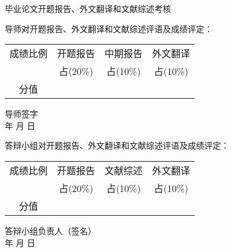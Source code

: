 
\thispagestyle{empty}
\begin{center}
\stfangsong\sanhao 毕业论文开题报告、外文翻译和文献综述考核
\end{center}
\songti\sihao 导师对开题报告、外文翻译和文献综述评语及成绩评定：
\vspace{4cm}


{\hspace{3cm} \songti\xiaosi
\begin{tabular}{|c|c|c|c|}
    \hline
    成绩比例 & \parbox[t]{4.5em}{开题报告} &\parbox[t]{4.5em}{中期报告} & \parbox[t]{4.5em}{外文翻译} \\
            & 占(20\%) & 占(10\%) & 占(10\%) \\

    \hline
    分值   & & &  \\
    \hline
\end{tabular}
}


\begin{flushright}
    导师签字\;\underline{\hspace{4em}}\\
    年 \quad 月 \quad 日
\end{flushright}

{\songti\sihao 答辩小组对开题报告、外文翻译和文献综述评语及成绩评定：}
\vspace{4cm}


{\hspace{3cm} \songti\xiaosi
\begin{tabular}{|c|c|c|c|}
    \hline
    成绩比例 & \parbox[t]{4.5em}{开题报告} &\parbox[t]{4.5em}{文献综述} & \parbox[t]{4.5em}{外文翻译} \\
            & 占(20\%) & 占(10\%) & 占(10\%) \\

    \hline
    分值   & & &  \\
    \hline
\end{tabular}
}

\begin{flushright}
    答辩小组负责人（签名）\;\underline{\hspace{4em}}\\
    年 \quad 月 \quad 日
\end{flushright}


